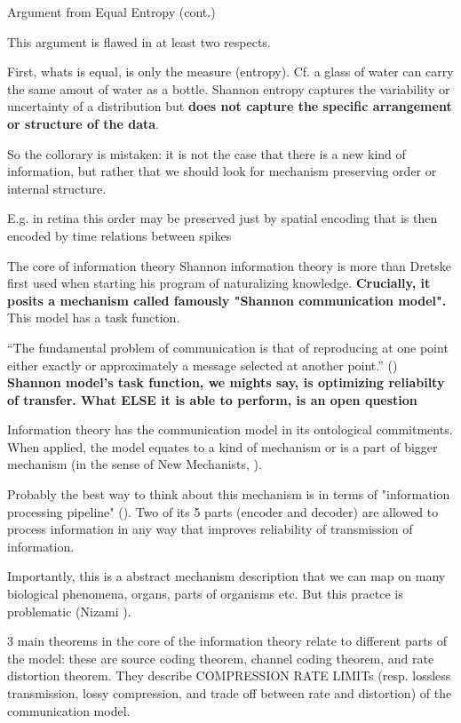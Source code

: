 \documentclass[10pt, aspectratio=169]{beamer}
\begin{document}
\begin{frame}{Argument from Equal Entropy (cont.)}    
       
This argument is flawed in at least two respects.

First, whats is equal, is only the measure (entropy). Cf. a glass of water can carry the same amout of water as a bottle.    Shannon entropy captures the variability or uncertainty of a distribution but \textbf{does not capture the specific arrangement or structure of the data}.


    So the collorary is mistaken: it is not the case that there is a new kind of information, but rather that we should look for mechanism preserving order  or internal structure.

    E.g. in retina this order may be preserved just by spatial encoding that is then encoded by time relations between spikes

   


\end{frame}




\begin{frame}{The core of information theory}
Shannon information theory is more than Dretske  first used when starting his program of naturalizing knowledge.  
    \textbf{Crucially, it posits a mechanism called famously "Shannon communication model".}  This model has a task function.

“The fundamental problem of communication is that of reproducing
at one point either exactly or approximately a message selected at
another point.” (\cite{shannon_mathematical_1948})
\textbf{
Shannon model's task function, we mights say, is  optimizing reliabilty of transfer. What ELSE it is able to perform, is an open question}
    
Information theory has the communication model in its ontological commitments. When applied, the model equates to a kind of mechanism or is a part of bigger mechanism (in the sense of New Mechanists, \cite{machamer_thinking_2000,glennan_rethinking_2002}).
    
    Probably the best way to think about this mechanism is in terms of "information processing pipeline" (\cite{martinez_representations_2019}).
    Two of its 5 parts (encoder and decoder) are allowed to process information in any way that improves reliability of transmission of information.

    Importantly, this is a abstract mechanism description that we can map on many biological phenomena, organs, parts of organisms etc. But this practce is problematic (Nizami \cite{nizami_information_2019}).

    3 main theorems in the core of the information theory  relate to  different parts of the model: these are source coding theorem, channel coding theorem, and rate distortion theorem. They describe COMPRESSION  RATE LIMITs (resp. lossless transmission, lossy compression, and trade off between rate and distortion) of the communication model.


\end{frame}
\end{document}
